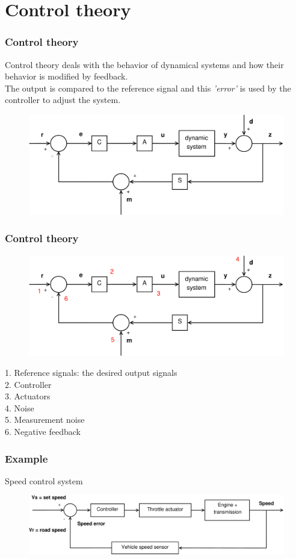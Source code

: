 \section{Control theory}

\begin{frame}
	\frametitle{Control theory}
	Control theory deals with the behavior of dynamical systems and how their behavior is modified by feedback.\\
	The output is compared to the reference signal and this \textit{'error'} is used by the controller to adjust the system. 
	\medskip
	\begin{figure}
		\includegraphics[width=1\linewidth]{full_system1}
	\end{figure}
\end{frame}

\begin{frame}
	\frametitle{Control theory}
	\begin{figure}
		\includegraphics[width=.8\linewidth]{full_system2}
	\end{figure}
	\vspace{-2ex}
	1. Reference signals: the desired output signals\\
	2. Controller\\
	3. Actuators\\
	4. Noise\\
	5. Measurement noise\\
	6. Negative feedback
\end{frame}

\begin{frame}
	\frametitle{Example}
	\vspace{-6ex}
	Speed control system\\
	\bigskip
	\bigskip
	\begin{figure}
		\includegraphics[width=1\linewidth]{speed_control_system}
	\end{figure}
\end{frame}


